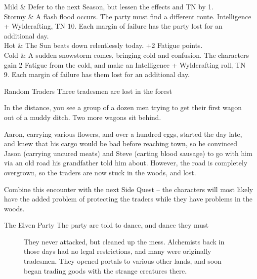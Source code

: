 \begin{multicols}{2}
\begin{rollchart}

	Mild & Defer to the next Season, but lessen the effects and TN by 1. \\
	Stormy & A flash flood occurs.  The party must find a different route.  Intelligence + Wyldcrafting, TN 10.  Each margin of failure has the party lost for an additional day. \\
	Hot & The Sun beats down relentlessly today.  +2 Fatigue points. \\
	Cold & A sudden snowstorm comes, bringing cold and confusion.  The characters gain 2 Fatigue from the cold, and make an Intelligence + Wyldcrafting roll, TN 9.  Each margin of failure has them lost for an additional day.

\end{rollchart}

{Random Traders}%
{Three tradesmen are lost in the forest}%

\begin{boxtext}
	In the distance, you see a group of a dozen men trying to get their first wagon out of a muddy ditch.  Two more wagons sit behind.
\end{boxtext}

Aaron, carrying various flowers, and over a hundred eggs, started the day late, and knew that his cargo would be bad before reaching \gls{town}, so he convinced Jason (carrying uncured meats) and Steve (carting blood sausage) to go with him via an old road his grandfather told him about.
However, the road is completely overgrown, so the traders are now stuck in the woods, and lost.

Combine this encounter with the next Side Quest -- the characters will most likely have the added problem of protecting the traders while they have problems in the woods.


{The Elven Party}%
{The party are told to dance, and dance they must}%

\begin{figure*}[b]
\begin{speechtext}

	They never attacked, but cleaned up the mess.  Alchemists back in those days had no legal restrictions, and many were originally tradesmen.  They opened portals to various other lands, and soon began trading goods with the strange creatures there.


\end{speechtext}
\end{figure*}
\end{multicols}
